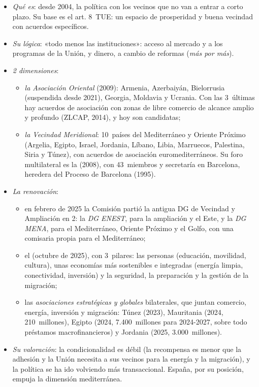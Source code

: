 \documentclass[11pt]{article}
\begin{document}
\begin{itemize}
\item \emph{Qué es}: desde 2004, la política con los vecinos que no van a entrar a corto plazo. Su base es el art. 8~TUE: un espacio de prosperidad y buena vecindad con acuerdos específicos.
\item \emph{Su lógica}: «todo menos las instituciones»: acceso al mercado y a los programas de la Unión, y dinero, a cambio de reformas (\emph{más por más}).
\item \emph{2 dimensiones}:
  \begin{itemize}
  \item \emph{la Asociación Oriental} (2009): Armenia, Azerbaiyán, Bielorrusia (suspendida desde 2021), Georgia, Moldavia y Ucrania. Con las 3~últimas hay acuerdos de asociación con zonas de libre comercio de alcance amplio y profundo (ZLCAP, 2014), y hoy son candidatas;
  \item \emph{la Vecindad Meridional}: 10~países del Mediterráneo y Oriente Próximo (Argelia, Egipto, Israel, Jordania, Líbano, Libia, Marruecos, Palestina, Siria y Túnez), con acuerdos de asociación euromediterráneos. Su foro multilateral es la  (2008), con 43~miembros y secretaría en Barcelona, heredera del Proceso de Barcelona (1995).
  \end{itemize}
\item \emph{La renovación}:
  \begin{itemize}
  \item en febrero de 2025 la Comisión partió la antigua DG de Vecindad y Ampliación en 2: la \emph{DG ENEST}, para la ampliación y el Este, y la \emph{DG MENA}, para el Mediterráneo, Oriente Próximo y el Golfo, con una comisaria propia para el Mediterráneo\nocite{CE2025DGMENA};
  \item el  (octubre de 2025), con 3~pilares: las personas (educación, movilidad, cultura), unas economías más sostenibles e integradas (energía limpia, conectividad, inversión) y la seguridad, la preparación y la gestión de la migración\nocite{CE2025PactoMediterraneo};
  \item las \emph{asociaciones estratégicas y globales} bilaterales, que juntan comercio, energía, inversión y migración: Túnez (2023), Mauritania (2024, 210~millones), Egipto (2024, 7.400~millones para 2024-2027, sobre todo préstamos macrofinancieros) y Jordania (2025, 3.000~millones)\nocite{Consejo2026Jordania}.
  \end{itemize}
\item \emph{Su valoración}: la condicionalidad es débil (la recompensa es menor que la adhesión y la Unión necesita a sus vecinos para la energía y la migración), y la política se ha ido volviendo más transaccional. España, por su posición, empuja la dimensión mediterránea.
\end{itemize}
\end{document}
